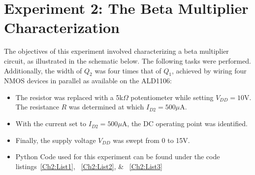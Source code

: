 \newpage



\section{Experiment 2: The Beta Multiplier Characterization}

The objectives of this experiment involved characterizing a beta multiplier circuit, as illustrated in the schematic below. The following tasks were performed. Additionally, the width of $Q_{2}$ was four times that of $Q_{1}$, achieved by wiring four NMOS devices in parallel as available on the ALD1106:

\begin{itemize}

    \item The resistor was replaced with a 5k$\Omega$ potentiometer while setting $V_{DD} = 10$V. The resistance $R$ was determined at which $I_{D2} = 500\mu$A.
    \item With the current set to $I_{D2} = 500\mu$A, the DC operating point was identified.
    \item Finally, the supply voltage $V_{DD}$ was swept from 0 to 15V.
    \item Python Code used for this experiment can be found under the code listings~\cref{Ch2:List1}, ~\cref{Ch2:List2}, \& ~\cref{Ch2:List3}
    
\end{itemize}

